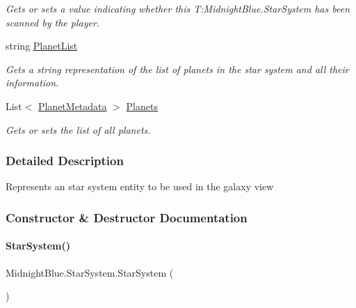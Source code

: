 \begin{DoxyCompactItemize}
\begin{DoxyCompactList}\small\item\em Gets or sets a value indicating whether this T\+:\+Midnight\+Blue.\+Star\+System has been scanned by the player. \end{DoxyCompactList}\item 
string \hyperlink{class_midnight_blue_1_1_star_system_af74f3d59d7010d0d0a57549f7bbd2639}{Planet\+List}
\begin{DoxyCompactList}\small\item\em Gets a string representation of the list of planets in the star system and all their information. \end{DoxyCompactList}\item 
List$<$ \hyperlink{class_midnight_blue_1_1_planet_metadata}{Planet\+Metadata} $>$ \hyperlink{class_midnight_blue_1_1_star_system_a041dfe27c393065732ea841516388c50}{Planets}
\begin{DoxyCompactList}\small\item\em Gets or sets the list of all planets. \end{DoxyCompactList}\end{DoxyCompactItemize}


\subsubsection{Detailed Description}
Represents an star system entity to be used in the galaxy view 



\subsubsection{Constructor \& Destructor Documentation}
\hypertarget{class_midnight_blue_1_1_star_system_a781acf7d61cc1609bc0f5db94593a963}{}\label{class_midnight_blue_1_1_star_system_a781acf7d61cc1609bc0f5db94593a963} 
\paragraph{\texorpdfstring{Star\+System()}{StarSystem()}}
{\footnotesize\ttfamily Midnight\+Blue.\+Star\+System.\+Star\+System (\begin{DoxyParamCaption}{ }\end{DoxyParamCaption})\hspace{0.3cm}{\ttfamily [inline]}}




